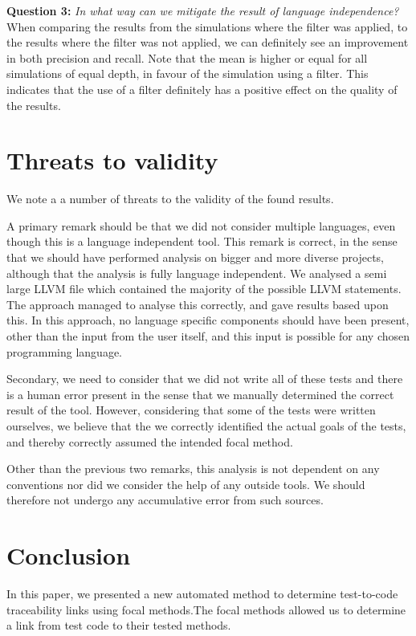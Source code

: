 \documentclass[11pt]{article}
\begin{document}
\begin{multicols}{2}
\textbf{Question 3:} \textit{In what way can we mitigate the result of language independence?}\\
When comparing the results from the simulations where the filter was applied, to the results where the filter was not applied, we can definitely see an improvement in both precision and recall. Note that the mean is higher or equal for all simulations of equal depth, in favour of the simulation using a filter. This indicates that the use of a filter definitely has a positive effect on the quality of the results.

\section{Threats to validity}
We note a a number of threats to the validity of the found results.

A primary remark should be that we did not consider multiple languages, even though this is a language independent tool. This remark is correct, in the sense that we should have performed analysis on bigger and more diverse projects, although that the analysis is fully language independent. We analysed a semi large LLVM file which contained the majority of the possible LLVM statements. The approach managed to analyse this correctly, and gave results based upon this. In this approach, no language specific components should have been present, other than the input from the user itself, and this input is possible for any chosen programming language. 

Secondary, we need to consider that we did not write all of these tests and there is a human error present in the sense that we manually determined the correct result of the tool. However, considering that some of the tests were written ourselves, we believe that the we correctly identified the actual goals of the tests, and thereby correctly assumed the intended focal method.

Other than the previous two remarks, this analysis is not dependent on any conventions nor did we consider the help of any outside tools. We should therefore not undergo any accumulative error from such sources.

\section{Conclusion}
In this paper, we presented a new automated method to determine test-to-code traceability links using focal methods.The focal methods allowed us to determine a link from test code to their tested methods.


\end{multicols}
\end{document}
